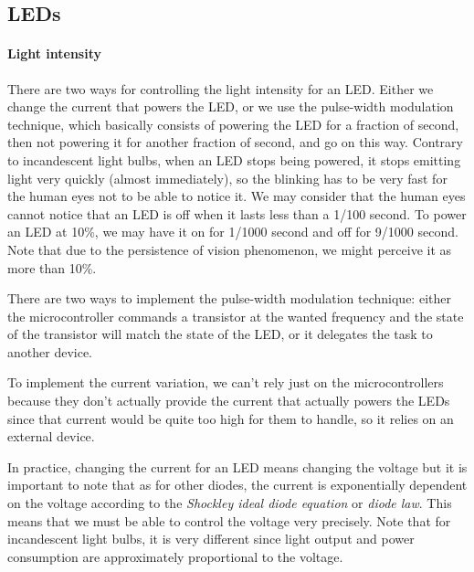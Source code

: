 \documentclass[12pt,twoside,a4paper]{article}
\begin{document}
\subsection{LEDs}

\paragraph{Light intensity}

There are  two ways  for controlling the  light intensity for  an LED.
Either  we change  the current  that  powers the  LED, or  we use  the
pulse-width modulation technique, which basically consists of powering
the LED  for a fraction  of second, then  not powering it  for another
fraction  of second,  and go  on this  way.  Contrary  to incandescent
light bulbs, when an LED  stops being powered, it stops emitting light
very quickly (almost immediately), so the blinking has to be very fast
for the human eyes not to be  able to notice it.  We may consider that
the human  eyes cannot notice  that an LED  is off when it  lasts less
than a 1/100 second.   To power an LED at 10\%, we  may have it on for
1/1000  second  and  off for  9/1000  second.  Note  that due  to  the
persistence of  vision phenomenon, we  might perceive it as  more than
10\%.

There are two ways to  implement the pulse-width modulation technique:
either  the  microcontroller  commands  a  transistor  at  the  wanted
frequency and the state of the  transistor will match the state of the
LED,  or it  delegates the  task to  another device.

To  implement  the  current  variation,  we can't  rely  just  on  the
microcontrollers because they don't  actually provide the current that
actually powers  the LEDs since that  current would be quite  too high
for them to handle, so it relies on an external device.

In  practice, changing  the  current  for an  LED  means changing  the
voltage but  it is  important to  note that as  for other  diodes, the
current  is exponentially dependent  on the  voltage according  to the
\emph{Shockley     ideal     diode     equation}    or     \emph{diode
  law}\cite{Shockley-diode-equation}.
This means that we must be able to control the voltage very precisely.
Note that  for incandescent  light bulbs, it  is very  different since
light output  and power consumption are  approximately proportional to
the voltage.
\end{document}
